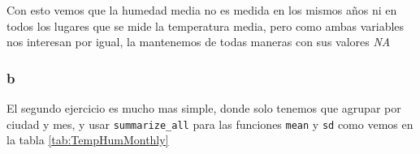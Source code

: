 \documentclass[]{book}
\newenvironment{Shaded}{\begin{snugshade}}{\end{snugshade}}
\newcommand{\DataTypeTok}[1]{\textcolor[rgb]{0.13,0.29,0.53}{#1}}
\newcommand{\KeywordTok}[1]{\textcolor[rgb]{0.13,0.29,0.53}{\textbf{#1}}}
\newcommand{\NormalTok}[1]{#1}
\newcommand{\OperatorTok}[1]{\textcolor[rgb]{0.81,0.36,0.00}{\textbf{#1}}}
\newcommand{\OtherTok}[1]{\textcolor[rgb]{0.56,0.35,0.01}{#1}}
\newcommand{\StringTok}[1]{\textcolor[rgb]{0.31,0.60,0.02}{#1}}
\begin{document}
Con esto vemos que la humedad media no es medida en los mismos años ni
en todos los lugares que se mide la temperatura media, pero como ambas
variables nos interesan por igual, la mantenemos de todas maneras con
sus valores \emph{NA}

\hypertarget{b-1}{%
\subsubsection{b}\label{b-1}}

El segundo ejercicio es mucho mas simple, donde solo tenemos que agrupar
por ciudad y mes, y usar \texttt{summarize\_all} para las funciones
\texttt{mean} y \texttt{sd} como vemos en la tabla
\ref{tab:TempHumMonthly}

\begin{Shaded}
\end{Shaded}
\end{document}
